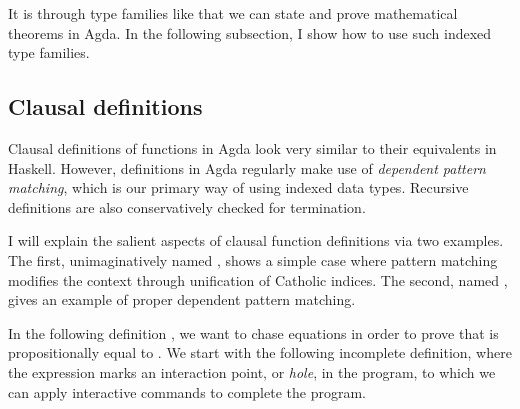 It is through type families like \AgdaDatatype{\_$\equiv$\_} that we can state
and prove mathematical theorems in Agda.
In the following subsection, I show how to use such indexed type families.

\subsection{Clausal definitions}

Clausal definitions of functions in Agda look very similar to their equivalents
in Haskell.
However, definitions in Agda regularly make use of
\emph{dependent pattern matching}, which is our primary way of using indexed
data types.
Recursive definitions are also conservatively checked for termination.

I will explain the salient aspects of clausal function definitions via two
examples.
The first, unimaginatively named , shows a simple case where
pattern matching modifies the context through unification of Catholic indices.
The second, named , gives an example of proper
dependent pattern matching.

In the following definition , we want to chase equations in
order to prove that  is propositionally equal to .
We start with the following incomplete definition, where the expression
 marks an interaction point, or \emph{hole}, in the program, to
which we can apply interactive commands to complete the program.

\begin{code}
\>[0]\AgdaSpace{}%
\AgdaSymbol{:}\AgdaSpace{}%
\AgdaSpace{}%
\AgdaSymbol{\{}\AgdaSpace{}%
\AgdaSymbol{:}\AgdaSpace{}%
\AgdaSymbol{\}}\AgdaSpace{}%
\AgdaSymbol{\{}\AgdaSpace{}%
\AgdaSpace{}%
\AgdaSpace{}%
\AgdaSymbol{:}\AgdaSpace{}%
\AgdaSymbol{\}}\AgdaSpace{}%
\AgdaSpace{}%
\AgdaSpace{}%
\AgdaSpace{}%
\AgdaSpace{}%
\AgdaSpace{}%
\AgdaSpace{}%
\AgdaSpace{}%
\AgdaSpace{}%
\AgdaSpace{}%
\AgdaSpace{}%
\AgdaSpace{}%
\<%
\\
\>[0]\AgdaSpace{}%
\AgdaSpace{}%
\AgdaSpace{}%
\AgdaSymbol{=}\AgdaSpace{}%
\<%
\end{code}

